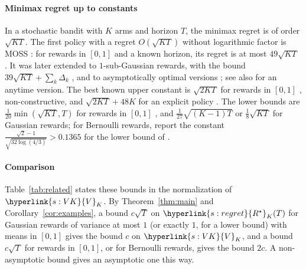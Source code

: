 \documentclass[11pt]{article}
\DeclareRobustCommand{\sy}[2]{{\hyperlink{#1}{#2}}}
\newcommand{\1}{\mathbf{1}}
\newcommand{\Rs}{\sy{s:regret}{R^\star}}
\newcommand{\VK}{\sy{s:VK}{V}}
\begin{document}
\paragraph{Minimax regret up to constants} In a stochastic bandit with $K$ arms and horizon $T$, the minimax regret is of order $\sqrt{KT}$. The first
policy with a regret $O(\sqrt{KT})$ without logarithmic factor is MOSS \citep{AB09}: for rewards in $[0,1]$ and a known horizon, its regret is at most
$49\sqrt{KT}$ \citep[Theorem~5]{AB09}. It was later extended to $1$-sub-Gaussian rewards, with the bound $39\sqrt{KT}+\sum_k\Delta_k$ \citep[Theorem~9.1]{LS},
and to asymptotically optimal versions \citep{MG17,GHMS22}; see also \citet{DP16} for an anytime version. The best known upper constant is
$\sqrt{2KT}$ for rewards in $[0,1]$ \citep[Theorem~6.1]{LS19}, non-constructive, and $\sqrt{2KT}+48K$ for an explicit policy \citep[Theorem~11]{ZL19}.
The lower bounds are $\frac1{20}\min(\sqrt{KT},T)$ for rewards in $[0,1]$ \citep[re-derived in][Appendix~B.1, following the original proof of
\citealp{ACFS02}]{GMS19}, and $\frac1{27}\sqrt{(K-1)T}$ \citep[Theorem~15.2]{LS} or $\frac18\sqrt{KT}$ \citep[Exercise~15.2]{LS} for Gaussian rewards;
for Bernoulli rewards, \citet[Section~5.2]{LWKW26} report the constant $\frac{\sqrt2-1}{\sqrt{32\log(4/3)}}>0.1365$ for the lower bound of
\citet[Theorem~6.11]{CBL06}.

\paragraph{Comparison} Table~\ref{tab:related} states these bounds in the normalization of $\VK_K$. By Theorem~\ref{thm:main} and
Corollary~\ref{cor:examples}, a bound $c\sqrt T$ on $\Rs_K(T)$ for Gaussian rewards of variance at most $1$ (or exactly $1$, for a lower bound) with
means in $[0,1]$ gives the bound $c$ on $\VK_K$, and a bound $c\sqrt T$ for rewards in $[0,1]$, or for Bernoulli rewards, gives the bound $2c$. A
non-asymptotic bound gives an asymptotic one this way.
\end{document}
